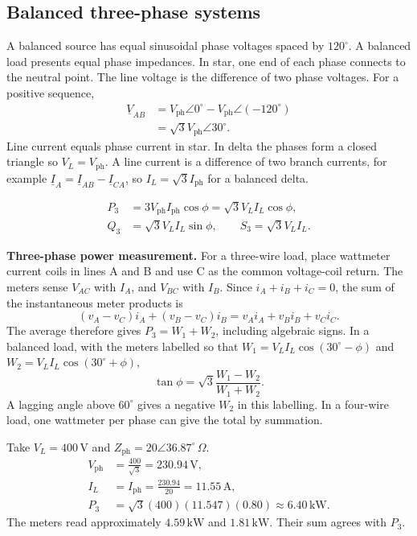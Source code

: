 \documentclass[12pt,a4paper]{article}
\begin{document}
\subsection{Balanced three-phase systems}
A balanced source has equal sinusoidal phase voltages spaced by \(120^\circ\). A balanced load presents equal phase impedances. In star, one end of each phase connects to the neutral point. The line voltage is the difference of two phase voltages. For a positive sequence,
\[
\begin{aligned}
\underline V_{AB}
 &= V_{\mathrm{ph}}\angle0^\circ-V_{\mathrm{ph}}\angle(-120^\circ)\\
 &=\sqrt3 V_{\mathrm{ph}}\angle30^\circ .
\end{aligned}
\]
Line current equals phase current in star. In delta the phases form a closed triangle so \(V_L=V_{\mathrm{ph}}\). A line current is a difference of two branch currents, for example \(\underline I_A=\underline I_{AB}-\underline I_{CA}\), so \(I_L=\sqrt3 I_{\mathrm{ph}}\) for a balanced delta.

\begin{tcolorbox}[formulabox,title={Balanced three-phase power}]
\[
\begin{aligned}
P_3&=3V_{\mathrm{ph}}I_{\mathrm{ph}}\cos\phi
    =\sqrt3 V_L I_L\cos\phi,\\
Q_3&=\sqrt3 V_L I_L\sin\phi,\qquad
S_3=\sqrt3 V_L I_L .
\end{aligned}
\]
\end{tcolorbox}

\textbf{Three-phase power measurement.}
For a three-wire load, place wattmeter current coils in lines A and B and use C as the common voltage-coil return. The meters sense \(V_{AC}\) with \(I_A\), and \(V_{BC}\) with \(I_B\). Since \(i_A+i_B+i_C=0\), the sum of the instantaneous meter products is
\[
(v_A-v_C)i_A+(v_B-v_C)i_B=v_Ai_A+v_Bi_B+v_Ci_C.
\]
The average therefore gives \(P_3=W_1+W_2\), including algebraic signs. In a balanced load, with the meters labelled so that \(W_1=V_L I_L\cos(30^\circ-\phi)\) and \(W_2=V_L I_L\cos(30^\circ+\phi)\),
\[
\tan\phi=\sqrt3\frac{W_1-W_2}{W_1+W_2}.
\]
A lagging angle above \(60^\circ\) gives a negative \(W_2\) in this labelling. In a four-wire load, one wattmeter per phase can give the total by summation. 
\begin{tcolorbox}[examplebox,title={Balanced star load and wattmeter readings}]
Take \(V_L=400\,\mathrm V\) and \(Z_{\mathrm{ph}}=20\angle36.87^\circ\,\Omega\).
\[
\begin{aligned}
V_{\mathrm{ph}}&=\frac{400}{\sqrt3}=230.94\,\mathrm V,\\
I_L&=I_{\mathrm{ph}}=\frac{230.94}{20}=11.55\,\mathrm A,\\
P_3&=\sqrt3(400)(11.547)(0.80)\approx6.40\,\mathrm{kW}.
\end{aligned}
\]
The meters read approximately \(4.59\,\mathrm{kW}\) and \(1.81\,\mathrm{kW}\). Their sum agrees with \(P_3\).
\end{tcolorbox}
\end{document}
